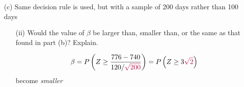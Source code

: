 \documentclass[
  10pt,
  ignorenonframetext,
]{beamer}
\begin{document}
\begin{frame}{(c) Same decision rule is used, but with a sample of 200
days rather than 100 days}
\protect\hypertarget{c-same-decision-rule-is-used-but-with-a-sample-of-200-days-rather-than-100-days-1}{}
\begin{enumerate}
        \item [(ii)] Would the value of $\beta$ be larger than, smaller than, or the same as that found in part (b)? Explain.
        
\pause 
\vspace{3mm}

$$
\beta = P\left(Z \geq \frac{776-740}{120/\textcolor{purple}{\sqrt{200}}}\right) = P\left(Z \geq 3\textcolor{purple}{\sqrt{2}}\right)
$$
become \textit{smaller}
\end{enumerate}
\end{frame}
\end{document}
